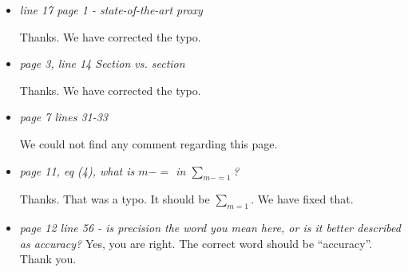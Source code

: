 \documentclass[11pt]{article}
\begin{document}
\begin{itemize}
\item \textit{line 17 page 1 - state-of-the-art proxy}

Thanks. We have corrected the typo.
  
\item \textit{page 3, line 14 Section vs. section}

  Thanks. We have corrected the typo.
  
\item \textit{page 7 lines 31-33}

We could not find any comment regarding this page. 

  
\item \textit{page 11, eq (4), what is \(m-=\) in \(\sum_{m-=1}\)?}

  Thanks. That was a typo. It should be \(\sum_{m=1}\). We have fixed that. 
  
\item \textit{page 12 line 56 - is precision the word you mean here, or is it
    better described as accuracy?}
  Yes, you are right. The correct word should be ``accuracy''. Thank you. 
\end{itemize}



\end{document}
